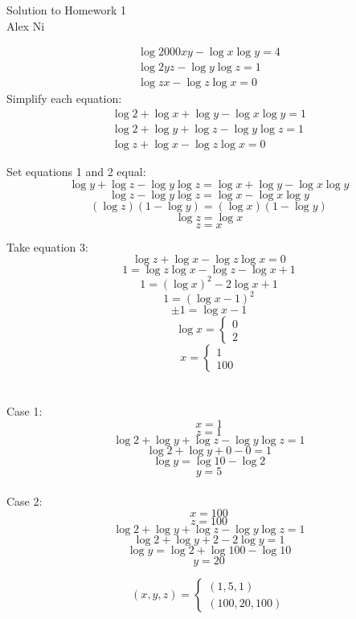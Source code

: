 \documentclass[letterpaper,12pt]{article}
\begin{document}
\begin{center} \huge Solution to Homework 1 \\ \normalsize Alex Ni
\end{center}
\large
\begin{eqnarray*}
\log{2000xy}-\log{x}\log{y}=4\\ 
\log{2yz}-\log{y}\log{z}=1\\
\log{zx}-\log{z}\log{x}=0
\end{eqnarray*}
\noindent Simplify each equation:
\begin{eqnarray*}
\log{2}+\log{x}+\log{y}-\log{x}\log{y}=1\\ 
\log{2}+\log{y}+\log{z}-\log{y}\log{z}=1\\
\log{z}+\log{x}-\log{z}\log{x}=0
\end{eqnarray*}

\noindent Set equations 1 and 2 equal:\\
$$\log{y}+\log{z}-\log{y}\log{z}=\log{x}+\log{y}-\log{x}\log{y}$$
$$\log{z}-\log{y}\log{z}=\log{x}-\log{x}\log{y}$$
$$(\log{z})(1-\log{y})=(\log{x})(1-\log{y})$$
$$\log{z}=\log{x}$$
$$z=x$$

\noindent Take equation 3:\\
$$\log{z}+\log{x}-\log{z}\log{x}=0$$
$$1=\log{z}\log{x}-\log{z}-\log{x}+1$$
$$1=(\log{x})^2-2\log{x}+1$$
$$1=(\log{x}-1)^2$$
$$\pm1=\log{x}-1$$
\begin{equation*}
\log{x}=
\begin{cases}
0\\
2
\end{cases}
\end{equation*}
\begin{equation*}
x=
\begin{cases}
1\\
100
\end{cases}
\end{equation*}
\\ \\
\noindent Case 1:\\
$$x=1$$ $$z=1$$
$$\log{2}+\log{y}+\log{z}-\log{y}\log{z}=1$$
$$\log{2}+\log{y}+0-0=1$$
$$\log{y}=\log{10}-\log{2}$$
$$y=5$$
\\
\noindent Case 2:\\
$$x=100$$ $$z=100$$
$$\log{2}+\log{y}+\log{z}-\log{y}\log{z}=1$$
$$\log{2}+\log{y}+2-2\log{y}=1$$
$$\log{y}=\log{2}+\log{100}-\log{10}$$
$$y=20$$

\begin{equation*}
{(x,y,z)}=\begin{cases}
{(1,5,1)}\\
{(100,20,100)}
\end{cases}
\end{equation*}
\end{document}
